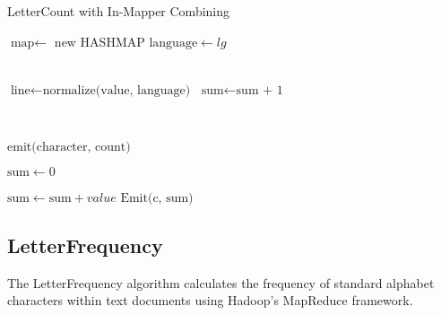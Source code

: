 \begin{algorithm}
    \caption{LetterCount with In-Mapper Combining}
    
    \begin{algorithmic}[1]
        \State $\text{map} \gets$ new HASHMAP 
        \State $\text{language} \gets lg$ 

        \EndMethod
        \\
    
        \State $\text{line} \gets \text{normalize(value, language)}$ 
            \State $\text{sum} \gets \text{sum + 1}$
        \EndFor

        \EndMethod
        \\
    

        \State $\text{emit(character, count)}$
        \EndFor
        \EndMethod
    \EndClass
    \end{algorithmic}
 
    \vspace{0.5cm}  %
    
    
    \begin{algorithmic}[1]
       
        \State $\text{sum} \gets 0$ 
    
        
            \State $\text{sum} \gets \text{sum} + value$ 
        \EndFor
        \State $\text{Emit(c, sum)}$ 
        \EndMethod
    \EndClass
    \end{algorithmic}
    
\end{algorithm}


\newpage
\subsection{LetterFrequency}
The LetterFrequency algorithm calculates the frequency of standard alphabet characters within text documents using Hadoop's MapReduce framework.

